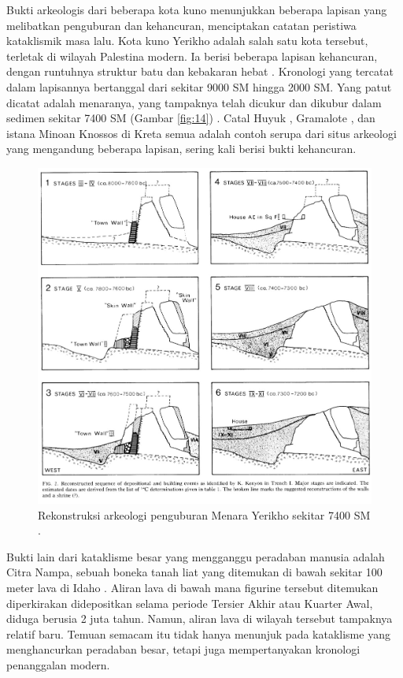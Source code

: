 \documentclass[10pt,twocolumn,letterpaper]{article}
\begin{document}
Bukti arkeologis dari beberapa kota kuno menunjukkan beberapa lapisan yang melibatkan penguburan dan kehancuran, menciptakan catatan peristiwa kataklismik masa lalu. Kota kuno Yerikho adalah salah satu kota tersebut, terletak di wilayah Palestina modern. Ia berisi beberapa lapisan kehancuran, dengan runtuhnya struktur batu dan kebakaran hebat \cite{96,97}. Kronologi yang tercatat dalam lapisannya bertanggal dari sekitar 9000 SM hingga 2000 SM. Yang patut dicatat adalah menaranya, yang tampaknya telah dicukur dan dikubur dalam sedimen sekitar 7400 SM (Gambar \ref{fig:14}) \cite{95}. Catal Huyuk \cite{99}, Gramalote \cite{98}, dan istana Minoan Knossos di Kreta \cite{100,101} semua adalah contoh serupa dari situs arkeologi yang mengandung beberapa lapisan, sering kali berisi bukti kehancuran.

\begin{figure}[t]
\begin{center}
   \includegraphics[width=1\linewidth]{jericho.jpg}
\end{center}
   \caption{Rekonstruksi arkeologi penguburan Menara Yerikho sekitar 7400 SM \cite{95}.}
\label{fig:14}
\label{fig:onecol}
\end{figure}

Bukti lain dari kataklisme besar yang mengganggu peradaban manusia adalah Citra Nampa, sebuah boneka tanah liat yang ditemukan di bawah sekitar 100 meter lava di Idaho \cite{102,103}. Aliran lava di bawah mana figurine tersebut ditemukan diperkirakan didepositkan selama periode Tersier Akhir atau Kuarter Awal, diduga berusia 2 juta tahun. Namun, aliran lava di wilayah tersebut tampaknya relatif baru. Temuan semacam itu tidak hanya menunjuk pada kataklisme yang menghancurkan peradaban besar, tetapi juga mempertanyakan kronologi penanggalan modern.
\end{document}
